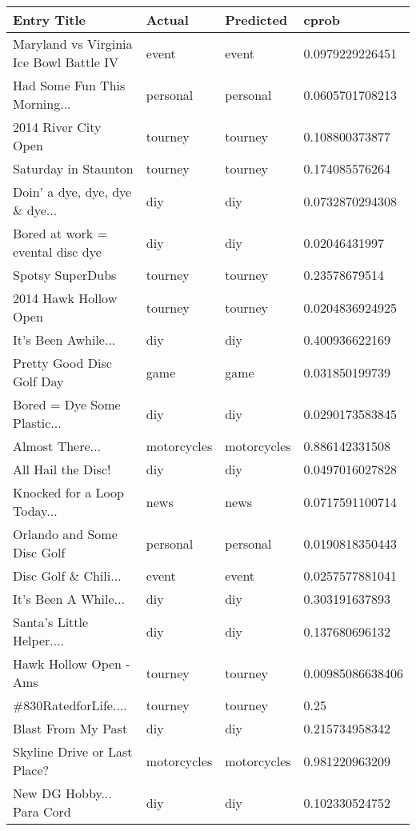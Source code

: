 \clearpage

\begin{table}[h!]
\centering
\begin{tabular}{| l | l | l | l |}
\hline
Entry Title & Actual & Predicted & cprob \\
\hline
Maryland vs Virginia Ice Bowl Battle IV & event & event & 0.0979229226451 \\
Had Some Fun This Morning... & personal & personal & 0.0605701708213 \\
2014 River City Open & tourney & tourney & 0.108800373877 \\
Saturday in Staunton & tourney & tourney & 0.174085576264 \\
Doin' a dye, dye, dye \& dye... & diy & diy & 0.0732870294308 \\
Bored at work = evental disc dye & diy & diy & 0.02046431997 \\
Spotsy SuperDubs & tourney & tourney & 0.23578679514 \\
2014 Hawk Hollow Open & tourney & tourney & 0.0204836924925 \\
It's Been Awhile... & diy & diy & 0.400936622169 \\
Pretty Good Disc Golf Day & game & game & 0.031850199739 \\
Bored = Dye Some Plastic... & diy & diy & 0.0290173583845 \\
Almost There... & motorcycles & motorcycles & 0.886142331508 \\
All Hail the Disc! & diy & diy & 0.0497016027828 \\
Knocked for a Loop Today... & news & news & 0.0717591100714 \\
Orlando and Some Disc Golf & personal & personal & 0.0190818350443 \\
Disc Golf \& Chili... & event & event & 0.0257577881041 \\
It's Been A While... & diy & diy & 0.303191637893 \\
Santa's Little Helper.... & diy & diy & 0.137680696132 \\
Hawk Hollow Open - Ams & tourney & tourney & 0.00985086638406 \\
\#830RatedforLife.... & tourney & tourney & 0.25 \\
Blast From My Past & diy & diy & 0.215734958342 \\
Skyline Drive or Last Place? & motorcycles & motorcycles & 0.981220963209 \\
New DG Hobby... Para Cord & diy & diy & 0.102330524752 \\

\end{tabular}
\end{table}

